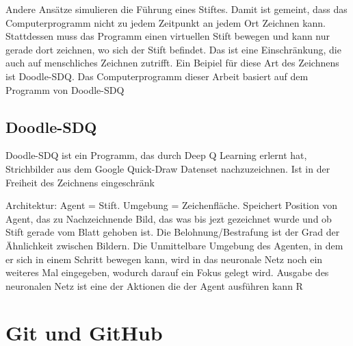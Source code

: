 Andere Ansätze simulieren die Führung eines Stiftes. Damit ist gemeint, dass das
Computerprogramm nicht zu jedem Zeitpunkt an jedem Ort Zeichnen kann.
Stattdessen muss das Programm einen virtuellen Stift bewegen und kann nur gerade
dort zeichnen, wo sich der Stift befindet. Das ist eine Einschränkung, die auch
auf menschliches Zeichnen zutrifft. Ein Beipiel für diese Art des Zeichnens ist
Doodle-SDQ. Das Computerprogramm dieser Arbeit basiert auf dem Programm von
Doodle-SDQ 

\subsection*{Doodle-SDQ}
Doodle-SDQ ist ein Programm, das durch Deep Q Learning erlernt hat, Strichbilder
aus dem Google Quick-Draw Datenset nachzuzeichnen. Ist in der Freiheit des
Zeichnens eingeschränk\indent 

Architektur: Agent = Stift. Umgebung = Zeichenfläche. Speichert Position von
Agent, das zu Nachzeichnende Bild, das was bis jezt gezeichnet wurde und ob
Stift gerade vom Blatt gehoben ist. Die Belohnung/Bestrafung ist der Grad der
Ähnlichkeit zwischen Bildern. Die Unmittelbare Umgebung des Agenten, in dem er
sich in einem Schritt bewegen kann, wird in das neuronale Netz noch ein weiteres
Mal eingegeben, wodurch darauf ein Fokus gelegt wird. Ausgabe des neuronalen
Netz ist eine der Aktionen die der Agent ausführen kann
R

\section{Git und GitHub}
\label{chap:t_git}



